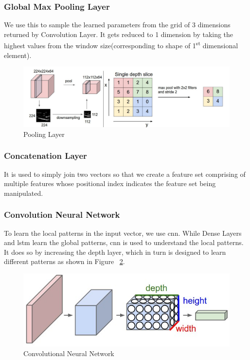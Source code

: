 \subsubsection{Global Max Pooling Layer}
We use this to sample the learned parameters from the grid of 3 dimensions returned by Convolution Layer. It gets reduced to 1 dimension by taking the highest values from the window size(corresponding to shape of 1\textsuperscript{st} dimensional element).
\begin{figure}
  [ht]\centering
  \includegraphics[width=.75\linewidth]{mainmatter/3-Methodology/images/pooling.png}
  \caption[]{Pooling Layer}
  \label{fig:pool_layer}
\end{figure}

\subsubsection{Concatenation Layer}
It is used to simply join two vectors so that we create a feature set comprising of multiple features whose positional index indicates the feature set being manipulated.

\subsubsection{Convolution Neural Network}
To learn the local patterns in the input vector, we use \acrshort{cnn}. While Dense Layers and \acrshort{lstm} learn the global patterns, \acrshort{cnn} is used to understand the local patterns. It does so by increasing the depth layer, which in turn is designed to learn different patterns as shown in Figure ~\ref{fig:cnn}.
\begin{figure}[ht]
  \centering
  \includegraphics[width=.5\linewidth]{mainmatter/3-Methodology/images/cnn.jpg}
  \caption{Convolutional Neural Network}
  \label{fig:cnn}
\end{figure}

